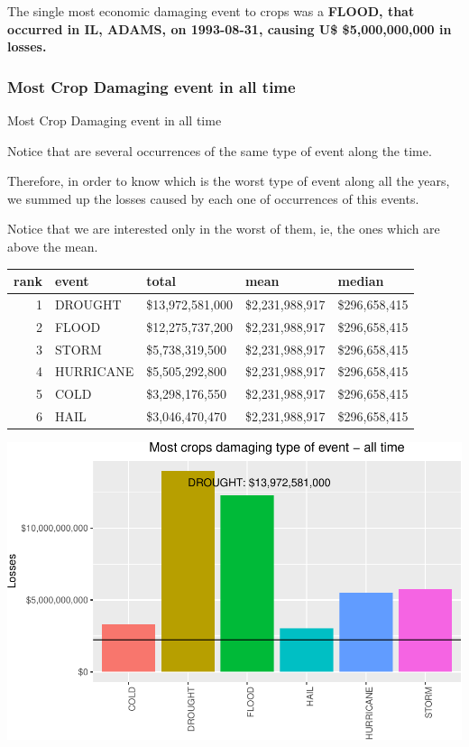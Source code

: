 \documentclass[]{article}
\begin{document}
The single most economic damaging event to crops was a \textbf{FLOOD,
that occurred in IL, ADAMS, on 1993-08-31, causing U\$ \$5,000,000,000
in losses.}

\subsubsection{Most Crop Damaging event in all
time}\label{most-crop-damaging-event-in-all-time}

Most Crop Damaging event in all time

Notice that are several occurrences of the same type of event along the
time.

Therefore, in order to know which is the worst type of event along all
the years, we summed up the losses caused by each one of occurrences of
this events.

Notice that we are interested only in the worst of them, ie, the ones
which are above the mean.

\begin{longtable}[]{@{}rllll@{}}
\toprule
rank & event & total & mean & median\tabularnewline
\midrule
\endhead
1 & DROUGHT & \$13,972,581,000 & \$2,231,988,917 &
\$296,658,415\tabularnewline
2 & FLOOD & \$12,275,737,200 & \$2,231,988,917 &
\$296,658,415\tabularnewline
3 & STORM & \$5,738,319,500 & \$2,231,988,917 &
\$296,658,415\tabularnewline
4 & HURRICANE & \$5,505,292,800 & \$2,231,988,917 &
\$296,658,415\tabularnewline
5 & COLD & \$3,298,176,550 & \$2,231,988,917 &
\$296,658,415\tabularnewline
6 & HAIL & \$3,046,470,470 & \$2,231,988,917 &
\$296,658,415\tabularnewline
\bottomrule
\end{longtable}

\includegraphics{readme_files/figure-latex/crop-all-plot-1.pdf}
\end{document}
